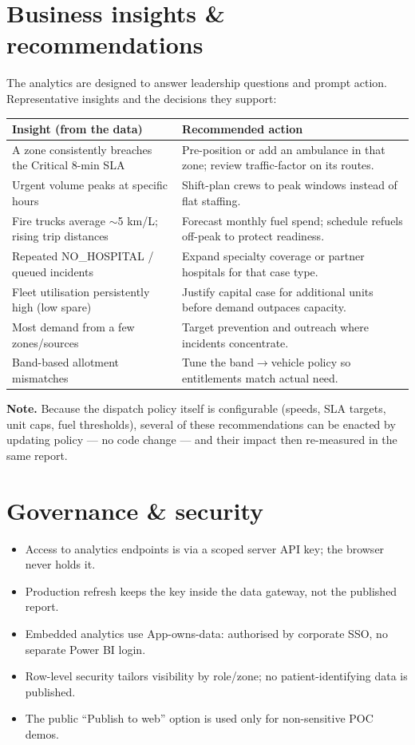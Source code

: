 \documentclass[11pt,a4paper]{article}
\newcommand{\notebox}[1]{%
  \par\vspace{4pt}\noindent
  \colorbox{soft}{\begin{minipage}{\dimexpr\linewidth-2\fboxsep}%
  \color{ink}\small\textbf{Note.} #1\end{minipage}}\par\vspace{6pt}}
\begin{document}
\section{Business insights \& recommendations}
The analytics are designed to answer leadership questions and prompt action. Representative
insights and the decisions they support:

\begin{tabularx}{\textwidth}{X X}
\toprule
\rowcolor{soft}\textbf{Insight (from the data)} & \textbf{Recommended action} \\
\midrule
A zone consistently breaches the Critical 8-min SLA & Pre-position or add an ambulance in that zone; review traffic-factor on its routes. \\
Urgent volume peaks at specific hours & Shift-plan crews to peak windows instead of flat staffing. \\
Fire trucks average $\sim$5 km/L; rising trip distances & Forecast monthly fuel spend; schedule refuels off-peak to protect readiness. \\
Repeated NO\_HOSPITAL / queued incidents & Expand specialty coverage or partner hospitals for that case type. \\
Fleet utilisation persistently high (low spare) & Justify capital case for additional units before demand outpaces capacity. \\
Most demand from a few zones/sources & Target prevention and outreach where incidents concentrate. \\
Band-based allotment mismatches & Tune the band$\to$vehicle policy so entitlements match actual need. \\
\bottomrule
\end{tabularx}

\notebox{Because the dispatch policy itself is configurable (speeds, SLA targets, unit caps,
fuel thresholds), several of these recommendations can be enacted by updating policy --- no code
change --- and their impact then re-measured in the same report.}

\section{Governance \& security}
\begin{itemize}[leftmargin=1.2em]
  \item Access to analytics endpoints is via a scoped server API key; the browser never holds it.
  \item Production refresh keeps the key inside the data gateway, not the published report.
  \item Embedded analytics use App-owns-data: authorised by corporate SSO, no separate Power BI login.
  \item Row-level security tailors visibility by role/zone; no patient-identifying data is published.
  \item The public ``Publish to web'' option is used only for non-sensitive POC demos.
\end{itemize}
\end{document}
